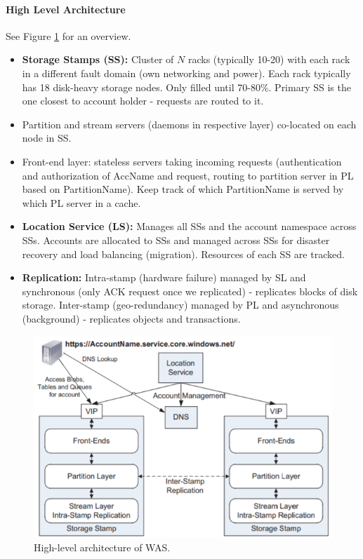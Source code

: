 \paragraph{High Level Architecture}
See Figure \ref{fig:was_arch} for an overview.
\begin{itemize}
    \item \textbf{Storage Stamps (SS):} Cluster of $N$ racks (typically 10-20) with each rack in a different fault domain (own networking and power). Each rack typically has 18 disk-heavy storage nodes. Only filled until 70-80\%. Primary SS is the one closest to account holder - requests are routed to it.
    \item Partition and stream servers (daemons in respective layer) co-located on each node in SS.
    \item Front-end layer: stateless servers taking incoming requests (authentication and authorization of AccName and request, routing to partition server in PL based on PartitionName). Keep track of which PartitionName is served by which PL server in a cache.
    \item \textbf{Location Service (LS):} Manages all SSs and the account namespace across SSs. Accounts are allocated to SSs and managed across SSs for disaster recovery and load balancing (migration). Resources of each SS are tracked.
    \item \textbf{Replication:} Intra-stamp (hardware failure) managed by SL and synchronous (only ACK request once we replicated) - replicates blocks of disk storage. Inter-stamp (geo-redundancy) managed by PL and asynchronous (background) - replicates objects and transactions.
\end{itemize}

\begin{figure}[h]
	\centering
	\includegraphics[scale=0.7]{images/2-was_arch.PNG}
	\caption{High-level architecture of WAS.}
	\label{fig:was_arch}
\end{figure}

